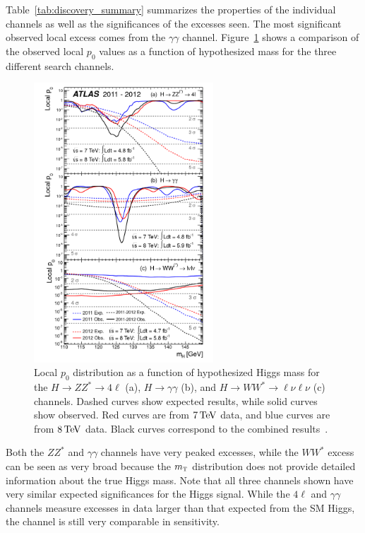 Table~\ref{tab:discovery_summary} summarizes the properties of the individual channels as well as the significances of the excesses seen. The most significant observed local excess comes from the $\gamma\gamma$ channel. Figure~\ref{fig:disc_p0_comp} shows a comparison of the observed local $p_0$ values as a function of hypothesized mass for the three different search channels. 
%
\begin{figure}[t!]
  \centering
  \captionsetup{justification=centering}
  \includegraphics[width=0.6\textwidth]{figures/discovery_p0_comp}
  \caption{Local $p_0$ distribution as a function of hypothesized Higgs mass for the $H\to ZZ^* \to 4\ell$ (a), $H\to\gamma\gamma$ (b), and $H\to WW^*\to \ell\nu\ell\nu$ (c) channels. Dashed curves show expected results, while solid curves show observed. Red curves are from $7 \TeV$ data, and blue curves are from $8\TeV$ data. Black curves correspond to the combined results~\cite{Discovery}.}
  \label{fig:disc_p0_comp}
\end{figure}
%
Both the $ZZ^*$ and $\gamma\gamma$ channels have very peaked excesses, while the $WW^*$ excess can be seen as very broad because the $m_{\textrm{\footnotesize\sc t}}$ distribution does not provide detailed information about the true Higgs mass. Note that all three channels shown have very similar expected significances for the Higgs signal. While the $4\ell$ and $\gamma\gamma$ channels measure excesses in data larger than that expected from the SM Higgs, the \HWWfull channel is still very comparable in sensitivity. 

